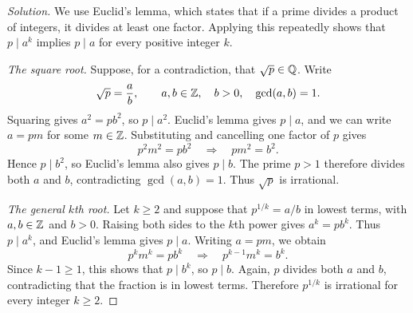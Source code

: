 
\begin{proof}[Solution]
We use Euclid's lemma, which states that if a prime divides a
product of integers, it divides at least one factor. Applying this
repeatedly shows that $p\mid a^k$ implies $p\mid a$ for every
positive integer $k$.

\textit{The square root.}
Suppose, for a contradiction, that $\sqrt p\in\mathbb{Q}$. Write
\[
  \sqrt p=\frac ab,
  \qquad a,b\in\mathbb{Z},\quad b>0,\quad\gcd(a,b)=1.
\]
Squaring gives $a^2=pb^2$, so $p\mid a^2$.
Euclid's lemma gives $p\mid a$, and we can write $a=pm$
for some $m\in\mathbb{Z}$. Substituting and cancelling one factor of $p$ gives
\[
  p^2m^2=pb^2
  \quad\Longrightarrow\quad
  pm^2=b^2.
\]
Hence $p\mid b^2$, so Euclid's lemma also gives $p\mid b$.
The prime $p>1$ therefore divides both $a$ and $b$,
contradicting $\gcd(a,b)=1$. Thus $\sqrt p$ is irrational.

\textit{The general $k$th root.}
Let $k\ge2$ and suppose that $p^{1/k}=a/b$ in lowest terms,
with $a,b\in\mathbb{Z}$ and $b>0$. Raising both sides to the $k$th
power gives $a^k=pb^k$. Thus $p\mid a^k$, and Euclid's lemma
gives $p\mid a$. Writing $a=pm$, we obtain
\[
  p^km^k=pb^k
  \quad\Longrightarrow\quad
  p^{k-1}m^k=b^k.
\]
Since $k-1\ge1$, this shows that $p\mid b^k$, so $p\mid b$.
Again, $p$ divides both $a$ and $b$, contradicting that the
fraction is in lowest terms. Therefore $p^{1/k}$ is irrational
for every integer $k\ge2$.
\end{proof}

